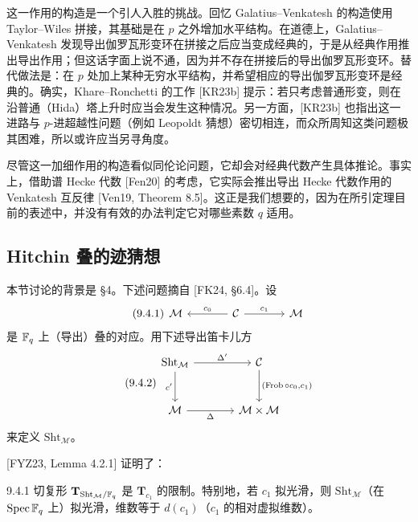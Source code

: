 这一作用的构造是一个引人入胜的挑战。回忆 Galatius–Venkatesh 的构造使用 Taylor–Wiles 拼接，其基础是在 $p$ 之外增加水平结构。在道德上，Galatius–Venkatesh 发现导出伽罗瓦形变环在拼接之后应当变成经典的，于是从经典作用推出导出作用；但这话字面上说不通，因为并不存在拼接后的导出伽罗瓦形变环。替代做法是：在 $p$ 处加上某种无穷水平结构，并希望相应的导出伽罗瓦形变环是经典的。确实，Khare–Ronchetti 的工作 [KR23b] 提示：若只考虑普通形变，则在沿普通（Hida）塔上升时应当会发生这种情况。另一方面，[KR23b] 也指出这一进路与 $p$-进超越性问题（例如 Leopoldt 猜想）密切相连，而众所周知这类问题极其困难，所以或许应当另寻角度。

尽管这一加细作用的构造看似同伦论问题，它却会对经典代数产生具体推论。事实上，借助谱 Hecke 代数 [Fen20] 的考虑，它实际会推出导出 Hecke 代数作用的 Venkatesh 互反律 [Ven19, Theorem 8.5]。这正是我们想要的，因为在所引定理目前的表述中，并没有有效的办法判定它对哪些素数 $q$ 适用。

\subsection{Hitchin 叠的迹猜想}

本节讨论的背景是 §4。下述问题摘自 [FK24, §6.4]。设
\begin{equation}\tag{9.4.1}\label{eq:a6-06-3}
\begin{tikzcd}[column sep=large]
\mathcal M & \mathcal C\arrow[l,"c_0"']\arrow[r,"c_1"] & \mathcal M
\end{tikzcd}
\end{equation}
是 $\mathbb{F}_q$ 上（导出）叠的对应。用下述导出笛卡儿方
\begin{equation}\tag{9.4.2}\label{eq:a6-06-4}
\begin{tikzcd}[column sep=large, row sep=large]
\mathrm{Sht}_{\mathcal M}\arrow[r,"\Delta'"]\arrow[d,"c'"'] & \mathcal C\arrow[d,"{(\Frob\circ c_0,c_1)}"]\\
\mathcal M\arrow[r,"\Delta"'] & \mathcal M\times\mathcal M
\end{tikzcd}
\end{equation}
来定义 $\mathrm{Sht}_{\mathcal M}$。

[FYZ23, Lemma 4.2.1] 证明了：

\begin{lem}{9.4.1}\label{thm:a6-06-10}
切复形 $\mathbf T_{\mathrm{Sht}_{\mathcal M}/\mathbb{F}_q}$ 是 $\mathbf T_{c_1}$ 的限制。特别地，若 $c_1$ 拟光滑，则 $\mathrm{Sht}_{\mathcal M}$（在 $\operatorname{Spec}\mathbb{F}_q$ 上）拟光滑，维数等于 $d(c_1)$（$c_1$ 的相对虚拟维数）。
\end{lem}

